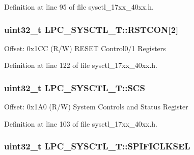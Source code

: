 Definition at line 95 of file sysctl\+\_\+17xx\+\_\+40xx.\+h.

\subsubsection[{\texorpdfstring{R\+S\+T\+C\+ON}{RSTCON}}]{ uint32\+\_\+t L\+P\+C\+\_\+\+S\+Y\+S\+C\+T\+L\+\_\+\+T\+::\+R\+S\+T\+C\+ON\mbox{[}2\mbox{]}}\hypertarget{structLPC__SYSCTL__T_ae7fbeba7b7acf3f7759d1de9eaf39ea1}{}\label{structLPC__SYSCTL__T_ae7fbeba7b7acf3f7759d1de9eaf39ea1}
Offset\+: 0x1\+CC (R/W) R\+E\+S\+ET Control0/1 Registers 

Definition at line 122 of file sysctl\+\_\+17xx\+\_\+40xx.\+h.

\subsubsection[{\texorpdfstring{S\+CS}{SCS}}]{ uint32\+\_\+t L\+P\+C\+\_\+\+S\+Y\+S\+C\+T\+L\+\_\+\+T\+::\+S\+CS}\hypertarget{structLPC__SYSCTL__T_a90bf168dbcc04b27d230b74b5e4d17a6}{}\label{structLPC__SYSCTL__T_a90bf168dbcc04b27d230b74b5e4d17a6}
Offset\+: 0x1\+A0 (R/W) System Controls and Status Register 

Definition at line 103 of file sysctl\+\_\+17xx\+\_\+40xx.\+h.

\subsubsection[{\texorpdfstring{S\+P\+I\+F\+I\+C\+L\+K\+S\+EL}{SPIFICLKSEL}}]{ uint32\+\_\+t L\+P\+C\+\_\+\+S\+Y\+S\+C\+T\+L\+\_\+\+T\+::\+S\+P\+I\+F\+I\+C\+L\+K\+S\+EL}\hypertarget{structLPC__SYSCTL__T_a8b3afcd7f261d6efbaa9756a14b2172f}{}\label{structLPC__SYSCTL__T_a8b3afcd7f261d6efbaa9756a14b2172f}


